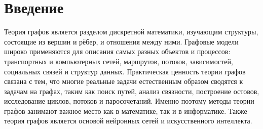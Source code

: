 \documentclass[14pt,a4paper]{extarticle}
\begin{document}
\thispagestyle{empty}

\newpage
\justifying
\tableofcontents

\newpage
\section*{Введение}

Теория графов является разделом дискретной математики, изучающим структуры, состоящие из вершин и рёбер, и отношения между ними. Графовые модели широко применяются для описания самых разных объектов и процессов: транспортных и компьютерных сетей, маршрутов, потоков, зависимостей, социальных связей и структур данных. Практическая ценность теории графов связана с тем, что многие реальные задачи естественным образом сводятся к задачам на графах, таким как поиск путей, анализ связности, построение остовов, исследование циклов, потоков и паросочетаний. Именно поэтому методы теории графов занимают важное место как в математике, так и в информатике. Также теория графов является основой нейронных сетей и искусственного интеллекта.
\end{document}
